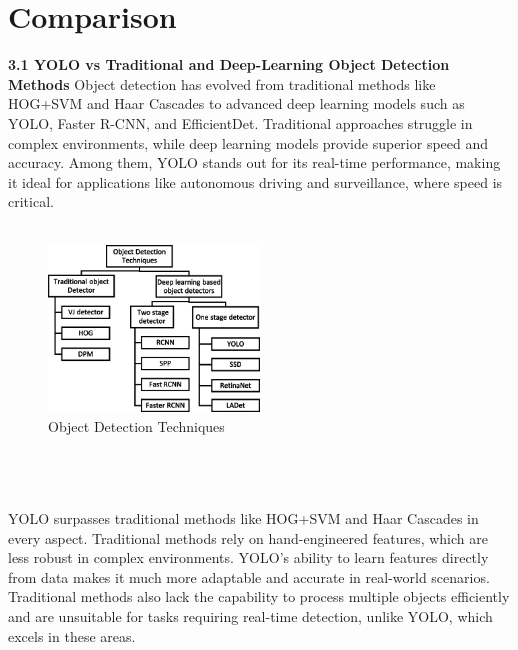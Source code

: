 \chapter{Comparison}
%
{ \textbf{3.1 {YOLO vs Traditional and Deep-Learning Object Detection Methods}}}\newline
\newline
%
Object detection has evolved from traditional methods like HOG+SVM and Haar Cascades to advanced deep learning models such as YOLO, Faster R-CNN, and EfficientDet. Traditional approaches struggle in complex environments, while deep learning models provide superior speed and accuracy. Among them, YOLO stands out for its real-time performance, making it ideal for applications like autonomous driving and surveillance, where speed is critical.\\\\
%
%
  \begin{figure}[h!]
    \centering
    \includegraphics[width=0.5\textwidth]{images/Object Detection Techniques.png}
    \caption{Object Detection Techniques}
    \label{fig:enter-label}
  \end{figure}
\\\\\\
%
%
YOLO surpasses traditional methods like HOG+SVM and Haar Cascades in every aspect. Traditional methods rely on hand-engineered features, which are less robust in complex environments. YOLO’s ability to learn features directly from data makes it much more adaptable and accurate in real-world scenarios. Traditional methods also lack the capability to process multiple objects efficiently and are unsuitable for tasks requiring real-time detection, unlike YOLO, which excels in these areas.\\
%
